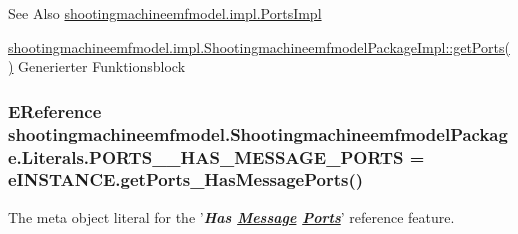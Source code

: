\begin{DoxySeeAlso}{See Also}
\hyperlink{classshootingmachineemfmodel_1_1impl_1_1_ports_impl}{shootingmachineemfmodel.\-impl.\-Ports\-Impl} 

\hyperlink{classshootingmachineemfmodel_1_1impl_1_1_shootingmachineemfmodel_package_impl_ab434e3a5bfcdf490bed77881dae0841e}{shootingmachineemfmodel.\-impl.\-Shootingmachineemfmodel\-Package\-Impl\-::get\-Ports()} Generierter Funktionsblock 
\end{DoxySeeAlso}
\hypertarget{interfaceshootingmachineemfmodel_1_1_shootingmachineemfmodel_package_1_1_literals_af1aad2cd07c3bdb92ac4925b82c06d86}{
\subsubsection[{P\-O\-R\-T\-S\-\_\-\-\_\-\-H\-A\-S\-\_\-\-M\-E\-S\-S\-A\-G\-E\-\_\-\-P\-O\-R\-T\-S}]{\setlength{\rightskip}{0pt plus 5cm}E\-Reference shootingmachineemfmodel.\-Shootingmachineemfmodel\-Package.\-Literals.\-P\-O\-R\-T\-S\-\_\-\-\_\-\-H\-A\-S\-\_\-\-M\-E\-S\-S\-A\-G\-E\-\_\-\-P\-O\-R\-T\-S = e\-I\-N\-S\-T\-A\-N\-C\-E.\-get\-Ports\-\_\-\-Has\-Message\-Ports()}}\label{interfaceshootingmachineemfmodel_1_1_shootingmachineemfmodel_package_1_1_literals_af1aad2cd07c3bdb92ac4925b82c06d86}
The meta object literal for the '{\itshape {\bfseries Has \hyperlink{interfaceshootingmachineemfmodel_1_1_message}{Message} \hyperlink{interfaceshootingmachineemfmodel_1_1_ports}{Ports}}}' reference feature.


